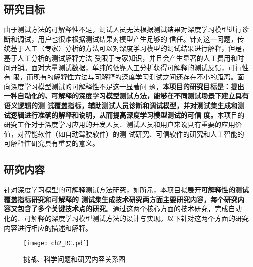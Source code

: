 \subsection{研究目标}\label{ch2target}

由于测试方法的可解释性不足，测试人员无法根据测试结果对深度学习模型进行诊断和调试，用户也很难根据测试结果对模型产生足够的
信任。针对这一问题，传统基于人工（专家）分析的方法可以对深度学习模型的测试结果进行解释，但是，基于人工分析的测试解释方法
受限于专家知识，并且会产生显著的人工费用和时间开销。面对大量测试数据，单纯的依靠人工分析获得可解释的测试反馈，可行性有
限，而现有的解释性方法与可解释的深度学习测试之间还存在不小的距离。面向深度学习模型测试的可解释性不足这一显著问
题，\textbf{本项目的研究目标是：提出一种自动化的、可解释的深度学习模型测试方法，能够在不同测试场景下建立具有语义逻辑的测
    试覆盖指标，辅助测试人员诊断和调试模型，并对测试集生成和测试逻辑进行准确的解释和说明，从而提高深度学习模型测试的可信
    度。}本项目的研究工作对于深度学习应用的开发人员、测试人员和用户来说具有重要的应用价值，对智能软件（如自动驾驶软件）的测
试研究、可信软件的研究和人工智能的可解释性研究具有重要的意义。

\subsection{研究内容}\label{ch2content}

针对深度学习模型的可解释测试方法研究，如所示，本项目拟展开\textbf{可解释性的测试覆盖指标研究和可解释的
    测试集生成技术研究两方面主要研究内容，每个研究内容又包含了多个关键技术点的研究}。通过这两个核心方面的技术研究，完成自动
化的、可解释的深度学习模型测试方法的设计与实现。以下针对这两个方面的研究内容进行相应的描述和解释。

\begin{figure}[htp]
    \begin{small}
        \begin{center}
            \texttt{[image: ch2\_RC.pdf]}
        \end{center}
        \caption{挑战、科学问题和研究内容关系图}
        \label{fig:ch2:rc}
    \end{small}
\end{figure}

